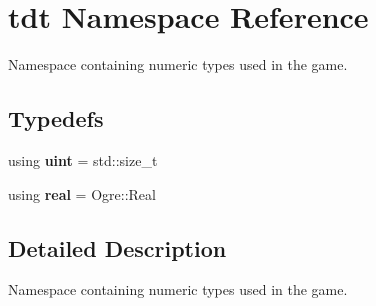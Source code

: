 \hypertarget{namespacetdt}{}\section{tdt Namespace Reference}
\label{namespacetdt}


Namespace containing numeric types used in the game.  


\subsection*{Typedefs}
\begin{DoxyCompactItemize}
\item 
using {\bfseries uint} = std\+::size\+\_\+t\hypertarget{namespacetdt_ab730e49caa2466704bfb27d5ae5badf5}{}\label{namespacetdt_ab730e49caa2466704bfb27d5ae5badf5}

\item 
using {\bfseries real} = Ogre\+::\+Real\hypertarget{namespacetdt_a296d8f187ff0a530db14134ea91db439}{}\label{namespacetdt_a296d8f187ff0a530db14134ea91db439}

\end{DoxyCompactItemize}


\subsection{Detailed Description}
Namespace containing numeric types used in the game. 